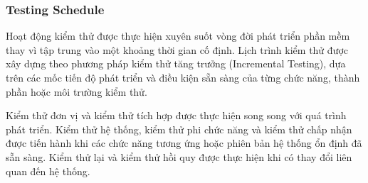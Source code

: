 \subsubsection{Testing Schedule}

Hoạt động kiểm thử được thực hiện xuyên suốt vòng đời phát triển phần mềm thay vì tập trung vào một khoảng thời gian cố định. Lịch trình kiểm thử được xây dựng theo phương pháp kiểm thử tăng trưởng (Incremental Testing), dựa trên các mốc tiến độ phát triển và điều kiện sẵn sàng của từng chức năng, thành phần hoặc môi trường kiểm thử.

Kiểm thử đơn vị và kiểm thử tích hợp được thực hiện song song với quá trình phát triển. Kiểm thử hệ thống, kiểm thử phi chức năng và kiểm thử chấp nhận được tiến hành khi các chức năng tương ứng hoặc phiên bản hệ thống ổn định đã sẵn sàng. Kiểm thử lại và kiểm thử hồi quy được thực hiện khi có thay đổi liên quan đến hệ thống.

